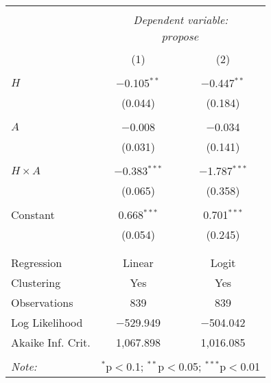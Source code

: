 
\begin{tabular}{@{\extracolsep{5pt}}lcc} 
\\[-1.8ex]\hline 
\hline \\[-1.8ex] 
 & \multicolumn{2}{c}{\textit{Dependent variable:}} \\ 
\cline{2-3} 
\\[-1.8ex] & \multicolumn{2}{c}{$propose$} \\ 
\\[-1.8ex] & (1) & (2)\\ 
\hline \\[-1.8ex] 
 $H$ & $-$0.105$^{**}$ & $-$0.447$^{**}$ \\ 
  & (0.044) & (0.184) \\ 
  & & \\ 
 $A$ & $-$0.008 & $-$0.034 \\ 
  & (0.031) & (0.141) \\ 
  & & \\ 
 $H\times A$ & $-$0.383$^{***}$ & $-$1.787$^{***}$ \\ 
  & (0.065) & (0.358) \\ 
  & & \\ 
 Constant & 0.668$^{***}$ & 0.701$^{***}$ \\ 
  & (0.054) & (0.245) \\ 
  & & \\ 
\hline \\[-1.8ex] 
Regression & Linear & Logit \\ 
Clustering & Yes & Yes \\ 
Observations & 839 & 839 \\ 
Log Likelihood & $-$529.949 & $-$504.042 \\ 
Akaike Inf. Crit. & 1,067.898 & 1,016.085 \\ 
\hline 
\hline \\[-1.8ex] 
\textit{Note:}  & \multicolumn{2}{r}{$^{*}$p$<$0.1; $^{**}$p$<$0.05; $^{***}$p$<$0.01} \\ 
\end{tabular} 
